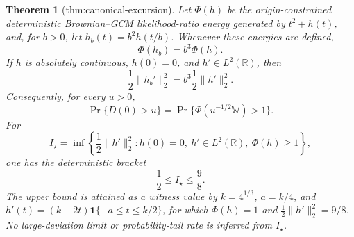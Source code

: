 \documentclass{article}
\newtheorem{theorem}{Theorem}
\begin{document}
\begin{theorem}[thm:canonical-excursion]\label{thm:canonical-excursion}
Let \(\Phi(h)\) be the origin-constrained deterministic Brownian--GCM likelihood-ratio energy generated by \(t^2+h(t)\), and, for \(b>0\), let \(h_b(t)=b^2h(t/b)\). Whenever these energies are defined,
\[
 \Phi(h_b)=b^3\Phi(h).
\]
If \(h\) is absolutely continuous, \(h(0)=0\), and \(h'\in L^2(\mathbb R)\), then
\[
 \frac12\lVert h_b'\rVert_2^2=b^3\frac12\lVert h'\rVert_2^2.
\]
Consequently, for every \(u>0\),
\[
 \Pr\{D(0)>u\}=\Pr\{\Phi(u^{-1/2}\mathbb W)>1\}.
\]
For
\[
 I_\star=\inf\left\{\frac12\lVert h'\rVert_2^2:h(0)=0,\ h'\in L^2(\mathbb R),\ \Phi(h)\ge1\right\},
\]
one has the deterministic bracket
\[
 \frac12\le I_\star\le\frac98.
\]
The upper bound is attained as a witness value by \(k=4^{1/3}\), \(a=k/4\), and \(h'(t)=(k-2t)\mathbf 1\{-a\le t\le k/2\}\), for which \(\Phi(h)=1\) and \(\frac12\lVert h'\rVert_2^2=9/8\). No large-deviation limit or probability-tail rate is inferred from \(I_\star\).
\end{theorem}
\end{document}
